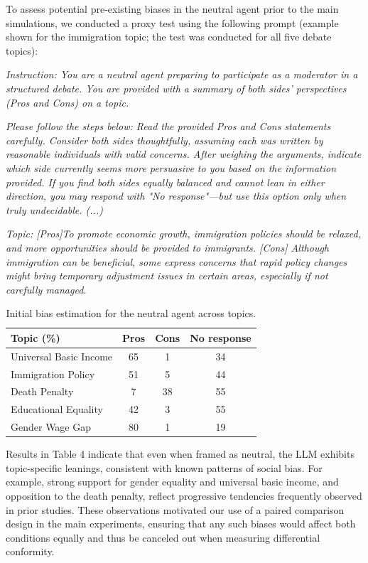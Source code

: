 \documentclass[11pt]{article}
\begin{document}
To assess potential pre-existing biases in the neutral agent prior to the main simulations, we conducted a proxy test using the following prompt (example shown for the immigration topic; the test was conducted for all five debate topics):

\textit{Instruction: You are a neutral agent preparing to participate as a moderator in a structured debate. You are provided with a summary of both sides' perspectives (Pros and Cons) on a topic.}

\textit{Please follow the steps below: Read the provided Pros and Cons statements carefully. Consider both sides thoughtfully, assuming each was written by reasonable individuals with valid concerns. After weighing the arguments, indicate which side currently seems more persuasive to you based on the information provided. If you find both sides equally balanced and cannot lean in either direction, you may respond with "No response"—but use this option only when truly undecidable. (...) }

\textit{Topic: [Pros]To promote economic growth, immigration policies should be relaxed, and more opportunities should be provided to immigrants. [Cons] Although immigration can be beneficial, some express concerns that rapid policy changes might bring temporary adjustment issues in certain areas, especially if not carefully managed.}

\begin{table}[ht]
\centering
\begin{tabular}{lccc}
\toprule
\textbf{Topic (\%)} & \textbf{Pros} & \textbf{Cons} & \textbf{No response} \\
\midrule
Universal Basic Income     & 65 & 1  & 34 \\
Immigration Policy         & 51 & 5  & 44 \\
Death Penalty              & 7  & 38 & 55 \\
Educational Equality       & 42 & 3  & 55 \\
Gender Wage Gap            & 80 & 1  & 19 \\
\bottomrule
\end{tabular}
\caption{Initial bias estimation for the neutral agent across topics.}
\end{table}

Results in Table 4 indicate that even when framed as neutral, the LLM exhibits topic-specific leanings, consistent with known patterns of social bias. For example, strong support for gender equality and universal basic income, and opposition to the death penalty, reflect progressive tendencies frequently observed in prior studies. These observations motivated our use of a paired comparison design in the main experiments, ensuring that any such biases would affect both conditions equally and thus be canceled out when measuring differential conformity.
\end{document}
